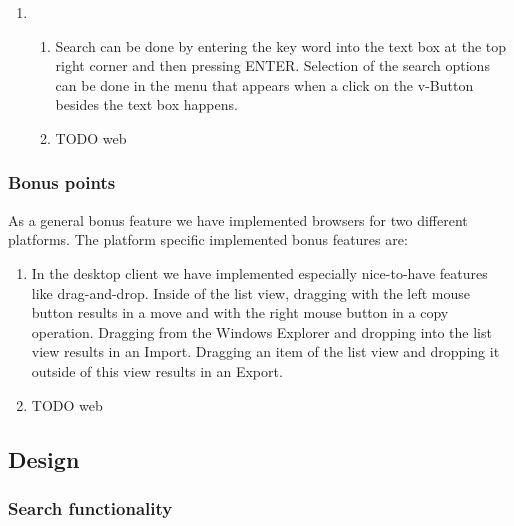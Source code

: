 \documentclass[a4paper,12pt]{article}
\begin{document}
\begin{enumerate}
\begin{enumerate} [label={(\alph*)}]
		\item TODO web
		\end{enumerate}
	\item
		\begin{enumerate} [label={(\alph*)}]
		\item Search can be done by entering the key word into the text box at the top right corner and then pressing ENTER. Selection of the search options can be done in the menu that appears when a click on the v-Button besides the text box happens.
		\item TODO web
		\end{enumerate}
\end{enumerate}

\subsubsection{Bonus points}
As a general bonus feature we have implemented browsers for two different platforms. The platform specific implemented bonus features are:
		\begin{enumerate} [label={(\alph*)}]
		\item In the desktop client we have implemented especially nice-to-have features like drag-and-drop. Inside of the list view, dragging with the left mouse button results in a move and with the right mouse button in a copy operation. Dragging from the Windows Explorer and dropping into the list view results in an Import. Dragging an item of the list view and dropping it outside of this view results in an Export.
		\item TODO web
		\end{enumerate}

\subsection{Design}

\subsubsection{Search functionality}
\label{sec:search_functionality}
\end{document}

